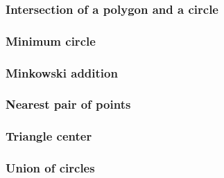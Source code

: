 \documentclass[titlepage,letterpaper,10pt]{article}
\begin{document}
\begin{multicols}{2}
				\subsubsection{Intersection of a polygon and a circle}
					
				\subsubsection{Minimum circle}
					
				\subsubsection{Minkowski addition}
					
				\subsubsection{Nearest pair of points}
					
				\subsubsection{Triangle center}
					
				\subsubsection{Union of circles}
					
    \end{multicols}
\end{document}
